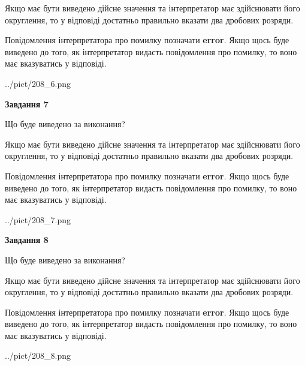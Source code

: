 \documentclass[12pt, ukrainian]{article}
\begin{document}
{\begin {Large}
Якщо має бути виведено дійсне значення та інтерпретатор має здійснювати його округлення, 
то у відповіді достатньо правильно вказати два дробових розряди.

Повідомлення інтерпретатора про помилку позначати \textbf{error}.
Якщо щось буде виведено до того, як інтерпретатор видасть повідомлення про помилку, 
то воно має вказуватись у відповіді. \par

\begin{center}
	{../pict/208_6.png}
\end{center}
\newpage

{\begin {center}\textbf{Завдання 7}\end {center}}\par
Що буде виведено за виконання? \par

Якщо має бути виведено дійсне значення та інтерпретатор має здійснювати його округлення, 
то у відповіді достатньо правильно вказати два дробових розряди.

Повідомлення інтерпретатора про помилку позначати \textbf{error}.
Якщо щось буде виведено до того, як інтерпретатор видасть повідомлення про помилку, 
то воно має вказуватись у відповіді. \par

\begin{center}
	{../pict/208_7.png}
\end{center}
\newpage

{\begin {center}\textbf{Завдання 8}\end {center}}\par
Що буде виведено за виконання? \par

Якщо має бути виведено дійсне значення та інтерпретатор має здійснювати його округлення, 
то у відповіді достатньо правильно вказати два дробових розряди.

Повідомлення інтерпретатора про помилку позначати \textbf{error}.
Якщо щось буде виведено до того, як інтерпретатор видасть повідомлення про помилку, 
то воно має вказуватись у відповіді. \par

\begin{center}
	{../pict/208_8.png}
\end{center}
\newpage


\end{Large}}
\end{document}
